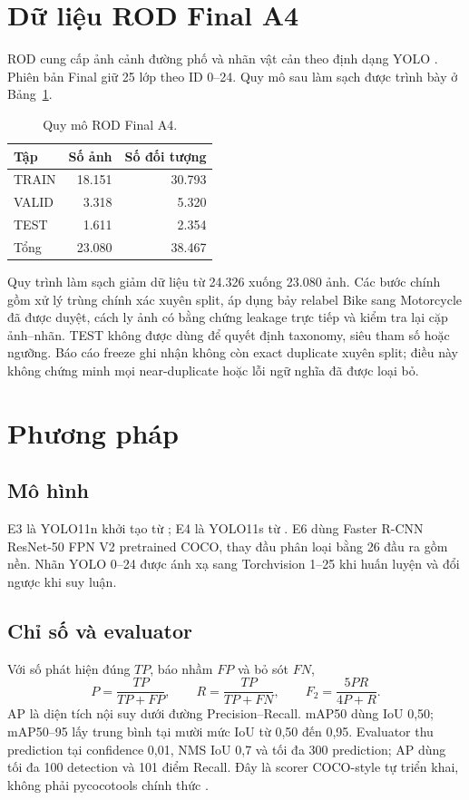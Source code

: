 \documentclass[10pt,a4paper,twocolumn]{article}
\begin{document}
\section{Dữ liệu ROD Final A4}
ROD cung cấp ảnh cảnh đường phố và nhãn vật cản theo định dạng YOLO \cite{rod_dataset}. Phiên bản Final giữ 25 lớp theo ID 0--24. Quy mô sau làm sạch được trình bày ở Bảng~\ref{tab:data}.
\begin{table}[ht]
\centering
\caption{Quy mô ROD Final A4.}\label{tab:data}
\begin{tabular}{lrr}\toprule
Tập & Số ảnh & Số đối tượng\\\midrule
TRAIN & 18.151 & 30.793\\
VALID & 3.318 & 5.320\\
TEST & 1.611 & 2.354\\\midrule
Tổng & 23.080 & 38.467\\\bottomrule
\end{tabular}
\end{table}

Quy trình làm sạch giảm dữ liệu từ 24.326 xuống 23.080 ảnh. Các bước chính gồm xử lý trùng chính xác xuyên split, áp dụng bảy relabel Bike sang Motorcycle đã được duyệt, cách ly ảnh có bằng chứng leakage trực tiếp và kiểm tra lại cặp ảnh--nhãn. TEST không được dùng để quyết định taxonomy, siêu tham số hoặc ngưỡng. Báo cáo freeze ghi nhận không còn exact duplicate xuyên split; điều này không chứng minh mọi near-duplicate hoặc lỗi ngữ nghĩa đã được loại bỏ.

\section{Phương pháp}
\subsection{Mô hình}
E3 là YOLO11n khởi tạo từ ; E4 là YOLO11s từ . E6 dùng Faster R-CNN ResNet-50 FPN V2 pretrained COCO, thay đầu phân loại bằng 26 đầu ra gồm nền. Nhãn YOLO 0--24 được ánh xạ sang Torchvision 1--25 khi huấn luyện và đổi ngược khi suy luận.

\subsection{Chỉ số và evaluator}
Với số phát hiện đúng $TP$, báo nhầm $FP$ và bỏ sót $FN$,
\begin{equation}P=\frac{TP}{TP+FP},\qquad R=\frac{TP}{TP+FN},\qquad F_2=\frac{5PR}{4P+R}.\end{equation}
AP là diện tích nội suy dưới đường Precision--Recall. mAP50 dùng IoU 0,50; mAP50--95 lấy trung bình tại mười mức IoU từ 0,50 đến 0,95. Evaluator thu prediction tại confidence 0,01, NMS IoU 0,7 và tối đa 300 prediction; AP dùng tối đa 100 detection và 101 điểm Recall. Đây là scorer COCO-style tự triển khai, không phải pycocotools chính thức \cite{coco_eval}.
\end{document}
